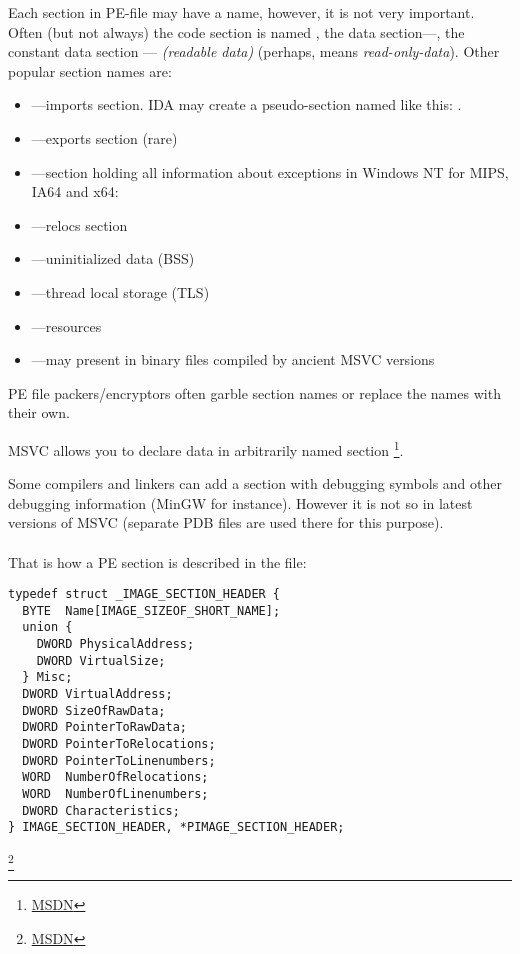 Each section in PE-file may have a name, however, it is not very important.
Often (but not always) the code section is named ,
the data section---, the constant data section ---  \emph{(readable data)}
(perhaps,  means \emph{read-only-data}).
Other popular section names are:

\begin{itemize}
\item {}---imports section.
\ac{IDA} may create a pseudo-section named like this: .
\item {}---exports section (rare)
\item {}---section holding all information about exceptions in Windows NT for MIPS, \ac{IA64} and x64: 
\item {}---relocs section
\item {}---uninitialized data (\ac{BSS})
\item {}---thread local storage (\ac{TLS})
\item {}---resources
\item {}---may present in binary files compiled by ancient MSVC versions
\end{itemize}

PE file packers/encryptors often garble section names or replace the names with their own.

\ac{MSVC} allows you to declare data in arbitrarily named section
\footnote{\href{http://msdn.microsoft.com/en-us/library/windows/desktop/cc307397.aspx}{MSDN}}.

Some compilers and linkers can add a section with debugging symbols and
other debugging information (MinGW for instance).
However it is not so in latest versions of \ac{MSVC} (separate \gls{PDB} files are used there for this purpose).\\
\\
That is how a PE section is described in the file:

\begin{lstlisting}[style=customc]
typedef struct _IMAGE_SECTION_HEADER {
  BYTE  Name[IMAGE_SIZEOF_SHORT_NAME];
  union {
    DWORD PhysicalAddress;
    DWORD VirtualSize;
  } Misc;
  DWORD VirtualAddress;
  DWORD SizeOfRawData;
  DWORD PointerToRawData;
  DWORD PointerToRelocations;
  DWORD PointerToLinenumbers;
  WORD  NumberOfRelocations;
  WORD  NumberOfLinenumbers;
  DWORD Characteristics;
} IMAGE_SECTION_HEADER, *PIMAGE_SECTION_HEADER;
\end{lstlisting}
\footnote{\href{http://msdn.microsoft.com/en-us/library/windows/desktop/ms680341(v=vs.85).aspx}{MSDN}}

